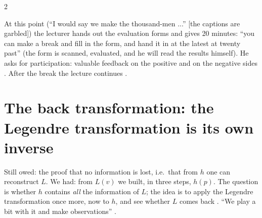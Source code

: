 \begin{paracol}{2}
\begin{coursenote}\label{cn:lt-eval}
At this point (``I would say we make the thousand-men ...'' [the captions are garbled]) the lecturer hands out the evaluation forms and gives 20 minutes: ``you can make a break and fill in the form, and hand it in at the latest at twenty past'' (the form is scanned, evaluated, and he will read the results himself). He asks for participation: valuable feedback on the positive and on the negative sides . After the break the lecture continues .
\end{coursenote}

\section{The back transformation: the Legendre transformation is its own inverse}\label{sec:lt-back}

Still owed: the proof that no information is lost, i.e.\ that from $h$ one can reconstruct $L$. We had: from $L(v)$ we built, in three steps, $h(p)$. The question is whether $h$ contains \emph{all} the information of $L$; the idea is to apply the Legendre transformation once more, now to $h$, and see whether $L$ comes back . ``We play a bit with it and make observations'' .


\end{paracol}
